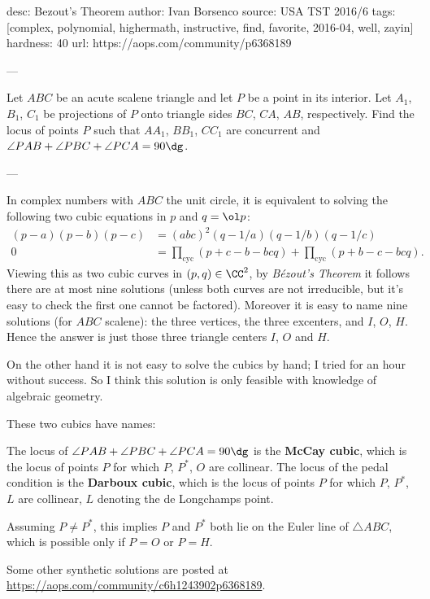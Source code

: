 desc:  Bezout's Theorem
author: Ivan Borsenco
source:  USA TST 2016/6
tags:  [complex, polynomial, highermath, instructive, find, favorite, 2016-04, well, zayin]
hardness: 40
url: https://aops.com/community/p6368189

---

Let $ABC$ be an acute scalene triangle
and let $P$ be a point in its interior.
Let $A_1$, $B_1$, $C_1$ be projections of $P$ onto
triangle sides $BC$, $CA$, $AB$, respectively.
Find the locus of points $P$ such that
$AA_1$, $BB_1$, $CC_1$ are concurrent
and $\angle PAB + \angle PBC + \angle PCA = 90\dg$.

---

In complex numbers with $ABC$ the unit circle,
it is equivalent to solving the following two cubic equations
in $p$ and $q = \ol p$:
\begin{align*}
 (p-a)(p-b)(p-c) &= (abc)^2 (q -1/a)(q - 1/b)(q - 1/c) \\
 0 &= \prod_{\text{cyc}} (p+c-b-bcq) + \prod_{\text{cyc}} (p+b-c-bcq).
\end{align*}
Viewing this as two cubic curves in $(p,q) \in \CC^2$,
by \emph{B\'ezout's Theorem} it follows there are at most nine solutions
(unless both curves are not irreducible,
but it's easy to check the first one cannot be factored).
Moreover it is easy to name nine solutions (for $ABC$ scalene):
the three vertices, the three excenters, and $I$, $O$, $H$.
Hence the answer is just those three triangle centers $I$, $O$ and $H$.

\begin{remark*}
  On the other hand it is not easy to solve the cubics by hand;
  I tried for an hour without success.
  So I think this solution is only feasible
  with knowledge of algebraic geometry.
\end{remark*}
\begin{remark*}
  These two cubics have names:
  \begin{itemize}
    \ii The locus of $\angle PAB + \angle PBC + \angle PCA = 90\dg$
    is the \textbf{McCay cubic},
    which is the locus of points $P$
    for which $P$, $P^\ast$, $O$ are collinear.
    \ii The locus of the pedal condition
    is the \textbf{Darboux cubic},
    which is the locus of points $P$
    for which $P$, $P^\ast$, $L$ are collinear,
    $L$ denoting the de Longchamps point.
  \end{itemize}
  Assuming $P \neq P^\ast$,
  this implies $P$ and $P^\ast$
  both lie on the Euler line of $\triangle ABC$,
  which is possible only if $P=O$ or $P=H$.

  Some other synthetic solutions are posted at
  \url{https://aops.com/community/c6h1243902p6368189}.
\end{remark*}

